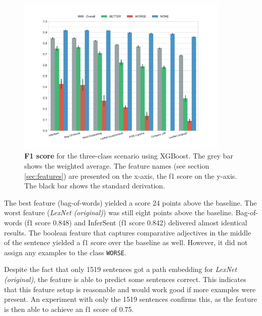 \begin{figure}[htbp]
      \caption{\textbf{F1 score} for the three-class scenario using XGBoost. The grey bar shows the weighted average. The feature names (see section \ref{sec:features}) are presented on the x-axis, the f1 score on the y-axis. The black bar shows the standard derivation.} 
    \label{fig:3_f1}
 \centering
	\includegraphics[width=0.9\textwidth]{images/experiments/f1-False}

\end{figure}


The best feature (bag-of-words) yielded a score 24 points above the baseline. The worst feature (\emph{LexNet (original)}) was still eight points above the baseline. Bag-of-words (f1 score 0.848) and InferSent (f1 score 0.842) delivered almost identical results. The boolean feature that captures comparative adjectives in the middle of the sentence yielded a f1 score over the baseline as well. However, it did not assign any examples to the class \texttt{WORSE}.

Despite the fact that only 1519 sentences got a path embedding for \emph{LexNet (original)}, the feature is able to predict some sentences correct. This indicates that this feature setup is reasonable and would work good if more examples were present. An experiment with only the 1519 sentences confirms this, as the feature is then able to achieve an f1 score of 0.75.

